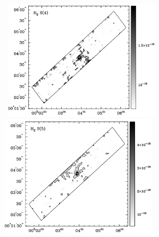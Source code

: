 \documentclass[manuscript]{aastex}
\begin{document}
\begin{figure}[!h]
\centerline{\hbox{\hspace{0.0in}
\includegraphics[width=8cm,angle=0]{bw_h2s4_contours.jpg}
\hspace{0.1in}
\includegraphics[width=8cm,angle=0]{bw_h2s5_contours.jpg}}}
\end{figure}
\end{document}
